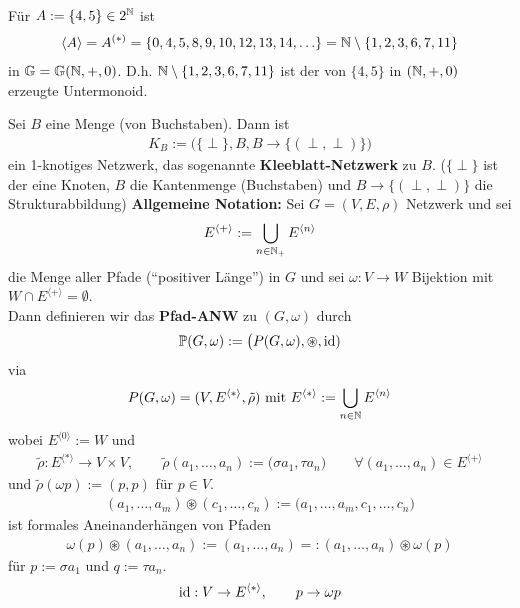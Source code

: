 \begin{beispiel}
    Für $A:=\lbrace 4,5\rbrace\in 2^{\mathbb{N}}$ ist 
    \begin{align*}
        \langle A\rangle=A^{(\ast)}=\lbrace0,4,5,8,9,10,12,13,14,\ldots\rbrace=\mathbb{N}\setminus\lbrace1,2,3,6,7,11\rbrace
    \end{align*}
    in $\mathbb{G}=\mathbb{G}(\mathbb{N},+,0)$. D.h. $\mathbb{N}\setminus\lbrace1,2,3,6,7,11\rbrace$ ist der von $\lbrace4,5\rbrace$ in $(\mathbb{N},+,0)$ erzeugte Untermonoid.
\end{beispiel}

Sei $B$ eine Menge (von Buchstaben). Dann ist 
\begin{align*}
    K_B:=\big(\lbrace\perp\rbrace,B,B\to\lbrace(\perp,\perp)\rbrace\Big)
\end{align*}
ein 1-knotiges Netzwerk, das sogenannte \textbf{Kleeblatt-Netzwerk} zu $B$.
($\lbrace\perp\rbrace$ ist der eine Knoten, $B$ die Kantenmenge (Buchstaben) und $B\to\lbrace(\perp,\perp)\rbrace$ die Strukturabbildung)\nl
\textbf{Allgemeine Notation:} Sei $G=(V,E,\rho)$ Netzwerk und sei
\begin{align*}
    E^{\langle+\rangle}:=\bigcup\limits_{n\in\mathbb{N}_+} E^{\langle n\rangle}
\end{align*}
die Menge aller Pfade (``positiver Länge'') in $G$ und sei $\omega:V\to W$ Bijektion mit $W\cap E^{\langle +\rangle}=\emptyset$.\\
Dann definieren wir das \textbf{Pfad-ANW} zu $(G,\omega)$ durch
\begin{align*}
    \mathbb{P}(G,\omega):=\big(P(G,\omega),\circledast,\operatorname{id})
\end{align*}
via
\begin{align*}
    P(G,\omega)=(V,E^{\langle\ast\rangle},\tilde{\rho})\text{ mit } E^{\langle\ast\rangle}:=\bigcup\limits_{n\in\mathbb{N}} E^{\langle n\rangle}
\end{align*}
wobei $E^{\langle0\rangle}:=W$ und
\begin{align*}
    \tilde{\rho}:E^{\langle\ast\rangle}\to V\times V,\qquad\tilde{\rho}(a_1,\ldots,a_n):=\big(\sigma a_1,\tau a_n\big)
    \qquad\forall(a_1,\ldots,a_n)\in E^{\langle+\rangle}
\end{align*}
und $\tilde{\rho}(\omega p):=(p,p)$ für $p\in V$.
\begin{align*}
    (a_1,\ldots,a_m)\circledast(c_1,\ldots,c_n)
    :=\big(a_1,\ldots,a_m,c_1,\ldots, c_n\big)
\end{align*}
ist formales Aneinanderhängen von Pfaden 
\begin{align*}
    \omega(p)\circledast(a_1,\ldots,a_n):=(a_1,\ldots,a_n)=:(a_1,\ldots,a_n)\circledast\omega(p)
\end{align*}
für $p:=\sigma a_1$ und $q:=\tau a_n$.
\begin{align*}
    \operatorname{id}:V\to E^{\langle\ast\rangle},\qquad p\to\omega p
\end{align*}

